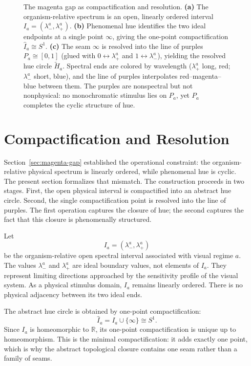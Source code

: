 \documentclass[preprint,12pt,authoryear]{elsarticle}
\theoremstyle{plain}
\theoremstyle{definition}
\theoremstyle{remark}
\begin{document}
\begin{figure}[t]
{\begin{tikzpicture}[>=Stealth, line width=0.8pt, every node/.style={inner sep=1.5pt}]
\end{tikzpicture}%
}
\caption{The magenta gap as compactification and resolution.
\textbf{(a)} The organism-relative spectrum is an open, linearly ordered
interval $I_a=(\lambda_-^a,\lambda_+^a)$.
\textbf{(b)} Phenomenal hue identifies the two ideal endpoints at a single
point $\infty$, giving the one-point compactification $\widehat{I}_a\cong S^1$.
\textbf{(c)} The seam $\infty$ is resolved into the line of purples
$P_a\cong[0,1]$ (glued with $0\leftrightarrow\lambda_+^a$ and
$1\leftrightarrow\lambda_-^a$), yielding the resolved hue circle
$\widetilde{H}_a$. Spectral ends are colored by wavelength
($\lambda_+^a$ long, red; $\lambda_-^a$ short, blue), and the line of
purples interpolates red--magenta--blue between them. The purples are
nonspectral but not nonphysical: no monochromatic stimulus lies on $P_a$,
yet $P_a$ completes the cyclic structure of hue.}
\label{fig:magenta-gap}
\end{figure}


\section{Compactification and Resolution}
\label{sec:compactification}

\noindent Section~\ref{sec:magenta-gap} established the operational constraint: the organism-relative physical spectrum is linearly ordered, while phenomenal hue is cyclic. The present section formalizes that mismatch. The construction proceeds in two stages. First, the open physical interval is compactified into an abstract hue circle. Second, the single compactification point is resolved into the line of purples. The first operation captures the closure of hue; the second captures the fact that this closure is phenomenally structured.

Let
\[
I_a=(\lambda_-^a,\lambda_+^a)
\]
be the organism-relative open spectral interval associated with visual regime $a$. The values $\lambda_-^a$ and $\lambda_+^a$ are ideal boundary values, not elements of $I_a$. They represent limiting directions approached by the sensitivity profile of the visual system. As a physical stimulus domain, $I_a$ remains linearly ordered. There is no physical adjacency between its two ideal ends.

The abstract hue circle is obtained by one-point compactification:
\[
\widehat I_a=I_a\cup\{\infty\}\cong S^1.
\]
Since $I_a$ is homeomorphic to $\mathbb{R}$, its one-point compactification is unique up to homeomorphism. This is the minimal compactification: it adds exactly one point, which is why the abstract topological closure contains one seam rather than a family of seams.
\end{document}
